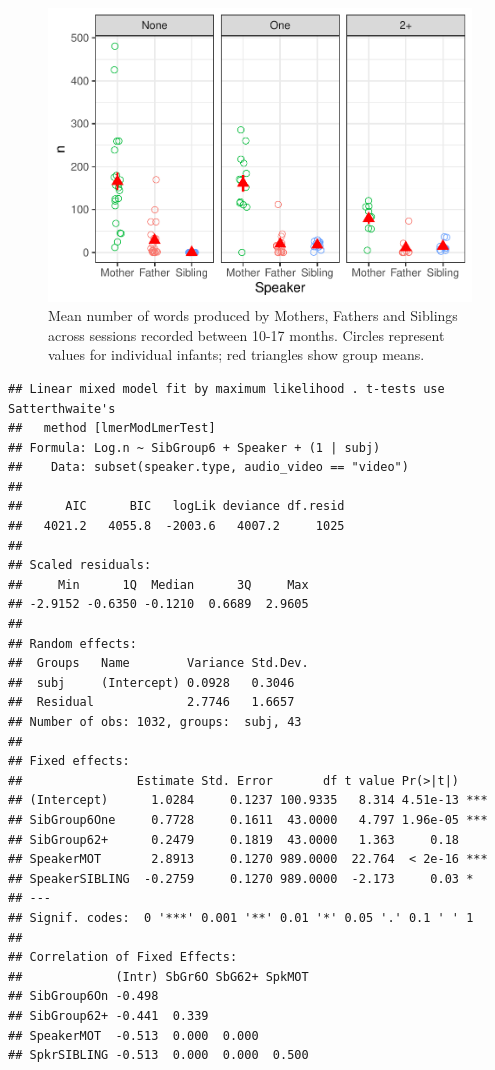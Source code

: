 \documentclass[
  english,
  man,floatsintext]{apa6}
\begin{document}
\begin{figure}
\centering
\includegraphics{SiblingsStudyText_files/figure-latex/Figure-Speaker-count-1.pdf}
\caption{\label{fig:Figure-Speaker-count}Mean number of words produced by Mothers, Fathers and Siblings across sessions recorded between 10-17 months. Circles represent values for individual infants; red triangles show group means.}
\end{figure}

\begin{verbatim}
## Linear mixed model fit by maximum likelihood . t-tests use Satterthwaite's
##   method [lmerModLmerTest]
## Formula: Log.n ~ SibGroup6 + Speaker + (1 | subj)
##    Data: subset(speaker.type, audio_video == "video")
## 
##      AIC      BIC   logLik deviance df.resid 
##   4021.2   4055.8  -2003.6   4007.2     1025 
## 
## Scaled residuals: 
##     Min      1Q  Median      3Q     Max 
## -2.9152 -0.6350 -0.1210  0.6689  2.9605 
## 
## Random effects:
##  Groups   Name        Variance Std.Dev.
##  subj     (Intercept) 0.0928   0.3046  
##  Residual             2.7746   1.6657  
## Number of obs: 1032, groups:  subj, 43
## 
## Fixed effects:
##                Estimate Std. Error       df t value Pr(>|t|)    
## (Intercept)      1.0284     0.1237 100.9335   8.314 4.51e-13 ***
## SibGroup6One     0.7728     0.1611  43.0000   4.797 1.96e-05 ***
## SibGroup62+      0.2479     0.1819  43.0000   1.363     0.18    
## SpeakerMOT       2.8913     0.1270 989.0000  22.764  < 2e-16 ***
## SpeakerSIBLING  -0.2759     0.1270 989.0000  -2.173     0.03 *  
## ---
## Signif. codes:  0 '***' 0.001 '**' 0.01 '*' 0.05 '.' 0.1 ' ' 1
## 
## Correlation of Fixed Effects:
##             (Intr) SbGr6O SbG62+ SpkMOT
## SibGroup6On -0.498                     
## SibGroup62+ -0.441  0.339              
## SpeakerMOT  -0.513  0.000  0.000       
## SpkrSIBLING -0.513  0.000  0.000  0.500
\end{verbatim}
\end{document}
